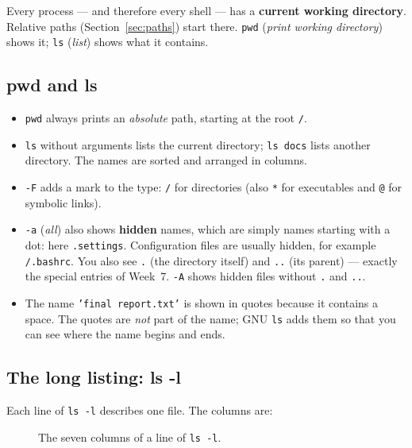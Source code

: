 \documentclass[11pt,a4paper]{article}
\newcommand{\term}[1]{\textbf{\color{mintdeep}#1}}
\newcommand{\cmd}[1]{\texttt{#1}}
\begin{document}
Every process --- and therefore every shell --- has a \term{current working directory}. Relative paths (Section~\ref{sec:paths}) start there. \cmd{pwd} (\emph{print working directory}) shows it; \cmd{ls} (\emph{list}) shows what it contains.

\subsection{pwd and ls}


\begin{itemize}
  \item \cmd{pwd} always prints an \emph{absolute} path, starting at the root \texttt{/}.
  \item \cmd{ls} without arguments lists the current directory; \cmd{ls docs} lists another directory. The names are sorted and arranged in columns.
  \item \cmd{-F} adds a mark to the type: \texttt{/} for directories (also \texttt{*} for executables and \texttt{@} for symbolic links).
  \item \cmd{-a} (\emph{all}) also shows \term{hidden} names, which are simply names starting with a dot: here \texttt{.settings}. Configuration files are usually hidden, for example \texttt{\tl/.bashrc}. You also see \texttt{.} (the directory itself) and \texttt{..} (its parent) --- exactly the special entries of Week~7. \cmd{-A} shows hidden files without \texttt{.} and \texttt{..}.
  \item The name \texttt{'final report.txt'} is shown in quotes because it contains a space. The quotes are \emph{not} part of the name; GNU \cmd{ls} adds them so that you can see where the name begins and ends.
\end{itemize}

\subsection{The long listing: ls -l}


Each line of \cmd{ls -l} describes one file. The columns are:

\begin{figure}[H]
\centering
{}
\caption{The seven columns of a line of \cmd{ls -l}.}
\label{fig:lsl}
\end{figure}
\end{document}
